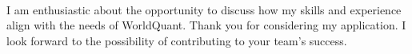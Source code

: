 \documentclass[11pt, a4paper]{awesome-cv}
\begin{document}
\begin{cvletter}
\\I am enthusiastic about the opportunity to discuss how my skills and experience align with the needs of WorldQuant. Thank you for considering my application. I look forward to the possibility of contributing to your team's success.






\end{cvletter}


\makeletterclosing
\end{document}
